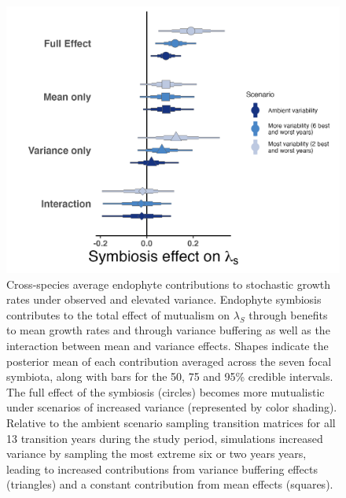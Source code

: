 \documentclass[9pt,twocolumn,twoside]{pnas-new}
\begin{document}
\begin{figure}
	\centering
	\includegraphics[width=.8\linewidth]{StochDemo_fig4.png}
	\caption{Cross-species average endophyte contributions to stochastic growth rates under observed and elevated variance. Endophyte symbiosis contributes to the total effect of mutualism on $\lambda_{S}$ through benefits to mean growth rates and through variance buffering as well as the interaction between mean and variance effects. Shapes indicate the posterior mean of each contribution averaged across the seven focal symbiota, along with bars for the 50, 75 and 95\% credible intervals.  The full effect of the symbiosis (circles) becomes more mutualistic under scenarios of increased variance (represented by color shading). Relative to the ambient scenario sampling transition matrices for all 13 transition years during the study period, simulations increased variance by sampling the most extreme six or two years years, leading to increased contributions from variance buffering effects (triangles) and a constant contribution from mean effects (squares).}
\end{figure}
\end{document}
